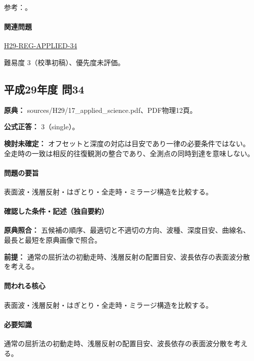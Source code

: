 \par 参考：\cite{jica_refraction2015,usgs_refraction2013,epa_surfacewaves,xia_rayleigh1999,coastal_reflection2016}。

\paragraph{関連問題} \hyperref[q:h29-reg-applied-34]{H29-REG-APPLIED-34}

\par 難易度 3（校準初稿）、優先度未評価。

\subsection{平成29年度 問34}
\label{q:h29-reg-applied-34}

\noindent\textbf{原典：} sources/H29/17\_applied\_science.pdf、PDF物理12頁。

\textbf{公式正答：} 3（single）。

\par\textbf{検討未確定：} オフセットと深度の対応は目安であり一律の必要条件ではない。全走時の一致は相反的往復観測の整合であり、全測点の同時到達を意味しない。

\paragraph{問題の要旨} 表面波・浅層反射・はぎとり・全走時・ミラージ構造を比較する。

\paragraph{確認した条件・記述（独自要約）}\mbox{}\par

\noindent\textbf{原典照合：} 五候補の順序、最適切と不適切の方向、波種、深度目安、曲線名、最長と最短を原典画像で照合。\par

\noindent\textbf{前提：} 通常の屈折法の初動走時、浅層反射の配置目安、波長依存の表面波分散を考える。\par

\paragraph{問われる核心} 表面波・浅層反射・はぎとり・全走時・ミラージ構造を比較する。

\paragraph{必要知識} 通常の屈折法の初動走時、浅層反射の配置目安、波長依存の表面波分散を考える。

